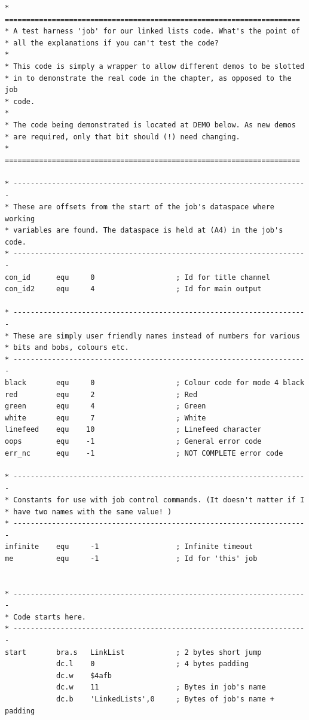\begin{lstlisting}[firstnumber=1,caption={Linked Lists - Wrapper - Part 1},label={LinkedListsWrapperPart1}]
* =====================================================================
* A test harness 'job' for our linked lists code. What's the point of
* all the explanations if you can't test the code?
*
* This code is simply a wrapper to allow different demos to be slotted
* in to demonstrate the real code in the chapter, as opposed to the job
* code.
*
* The code being demonstrated is located at DEMO below. As new demos
* are required, only that bit should (!) need changing.
* =====================================================================

* ---------------------------------------------------------------------
* These are offsets from the start of the job's dataspace where working
* variables are found. The dataspace is held at (A4) in the job's code.
* ---------------------------------------------------------------------
con_id      equ     0                   ; Id for title channel
con_id2     equ     4                   ; Id for main output

* ---------------------------------------------------------------------
* These are simply user friendly names instead of numbers for various
* bits and bobs, colours etc.
* ---------------------------------------------------------------------
black       equ     0                   ; Colour code for mode 4 black
red         equ     2                   ; Red
green       equ     4                   ; Green
white       equ     7                   ; White
linefeed    equ    10                   ; Linefeed character
oops        equ    -1                   ; General error code
err_nc      equ    -1                   ; NOT COMPLETE error code

* ---------------------------------------------------------------------
* Constants for use with job control commands. (It doesn't matter if I
* have two names with the same value! )
* ---------------------------------------------------------------------
infinite    equ     -1                  ; Infinite timeout
me          equ     -1                  ; Id for 'this' job


* ---------------------------------------------------------------------
* Code starts here.
* ---------------------------------------------------------------------
start       bra.s   LinkList            ; 2 bytes short jump
            dc.l    0                   ; 4 bytes padding
            dc.w    $4afb
            dc.w    11                  ; Bytes in job's name
            dc.b    'LinkedLists',0     ; Bytes of job's name + padding


\end{lstlisting}
